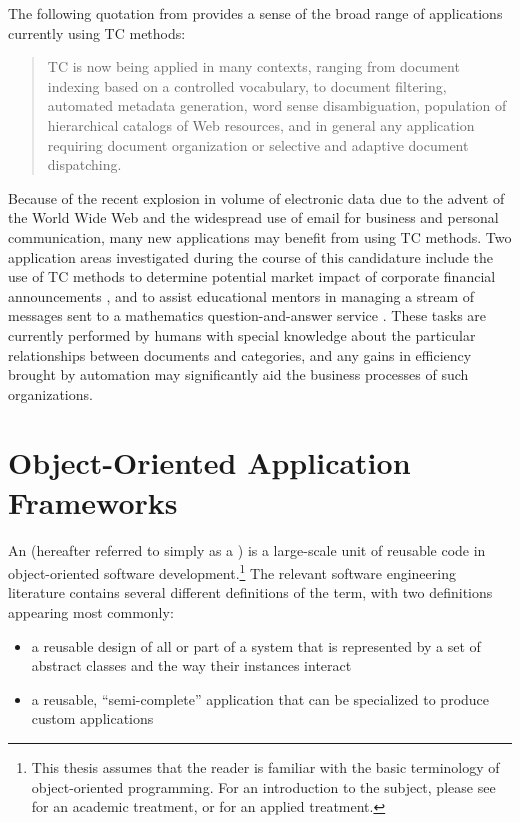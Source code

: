 The following quotation from \cite{sebastiani:02} provides a sense of
the broad range of applications currently using TC methods:

\begin{quote}
TC is now being applied in many contexts, ranging from document
indexing based on a controlled vocabulary, to document filtering,
automated metadata generation, word sense disambiguation, population
of hierarchical catalogs of Web resources, and in general any
application requiring document organization or selective and adaptive
document dispatching.
\end{quote}

Because of the recent explosion in volume of electronic data due to
the advent of the World Wide Web and the widespread use of email for
business and personal communication, many new applications may benefit
from using TC methods.  Two application areas investigated during the
course of this candidature include the use of TC methods to determine
potential market impact of corporate financial announcements
\cite{calvo:02}, and to assist educational mentors in managing a
stream of messages sent to a mathematics question-and-answer service
\cite{williams:02}.  These tasks are currently performed by humans
with special knowledge about the particular relationships between
documents and categories, and any gains in efficiency brought by
automation may significantly aid the business processes of such
organizations.

\section{Object-Oriented Application Frameworks}

An  (hereafter referred to
simply as a ) is a large-scale unit of reusable code
in object-oriented software development.\footnote{This thesis assumes
  that the reader is familiar with the basic terminology of
  object-oriented programming.  For an introduction to the subject,
  please see \cite{wirfs:90} for an academic treatment, or
  \cite{conway:99} for an applied treatment.}  The relevant software
engineering literature contains several different definitions of the
term, with two definitions appearing most commonly:

\begin{itemize}
\item a reusable design of all or part of a system that is represented
  by a set of abstract classes and the way their instances interact
  \cite{johnson:97}
\item a reusable, ``semi-complete'' application that can be
  specialized to produce custom applications \cite{fayad:97}
\end{itemize}

